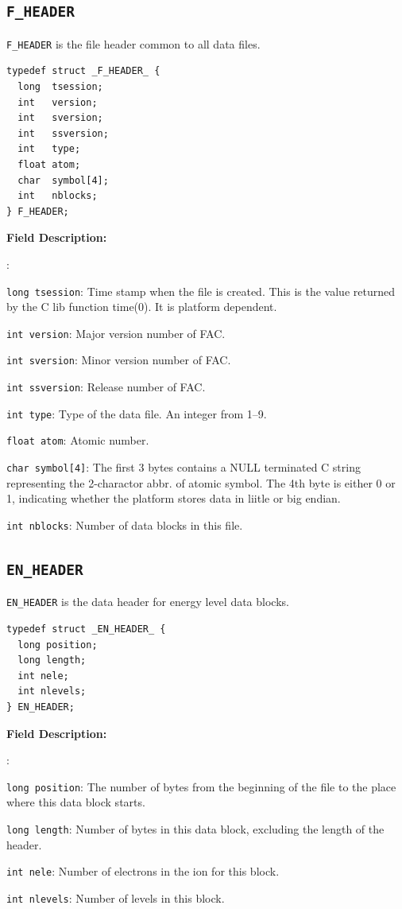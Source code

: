 \documentclass[twoside,letterpaper]{refrep}
\newenvironment{dbdesc}{\textbf{Field Description:} \begin{list}
	{:}{\setlength{\labelwidth}{2in}
	   \setlength{\leftmargin}{2in}
	   \setlength{\labelsep}{0.1in}
	   \setlength{\rightmargin}{0.2in}}}
	{\end{list}}
\begin{document}
\subsection{\texttt{F\_HEADER}}
\texttt{F\_HEADER} is the file header common to all data files. 

\begin{verbatim}
typedef struct _F_HEADER_ {
  long  tsession;
  int   version;
  int   sversion;
  int   ssversion;
  int   type;
  float atom;
  char  symbol[4];
  int   nblocks;
} F_HEADER;
\end{verbatim}

\begin{dbdesc}
\item[\texttt{long tsession}:] Time stamp when the file is created. This is the
value returned by the C lib function time(0). It is platform dependent. 
\item[\texttt{int version}:] Major version number of FAC.
\item[\texttt{int sversion}:] Minor version number of FAC.
\item[\texttt{int ssversion}:] Release number of FAC.
\item[\texttt{int type}:] Type of the data file. An integer from 1--9.
\item[\texttt{float atom}:] Atomic number.
\item[\texttt{char symbol[4]}:] The first 3 bytes contains a NULL
terminated C string representing the 2-charactor abbr. of atomic symbol. The
4th byte is either 0 or 1, indicating whether the platform stores data in
liitle or big endian.
\item[\texttt{int nblocks}:] Number of data blocks in this file.
\end{dbdesc}

\subsection{\texttt{EN\_HEADER}}
\texttt{EN\_HEADER} is the data header for energy level data blocks.

\begin{verbatim}
typedef struct _EN_HEADER_ {
  long position;
  long length;
  int nele;
  int nlevels;
} EN_HEADER;
\end{verbatim}

\begin{dbdesc}
\item[\texttt{long position}:] The number of bytes from the beginning of the
file to the place where this data block starts.
\item[\texttt{long length}:] Number of bytes in this data block, excluding the
length of the header.
\item[\texttt{int nele}:] Number of electrons in the ion for this block.
\item[\texttt{int nlevels}:] Number of levels in this block.
\end{dbdesc}
\end{document}
